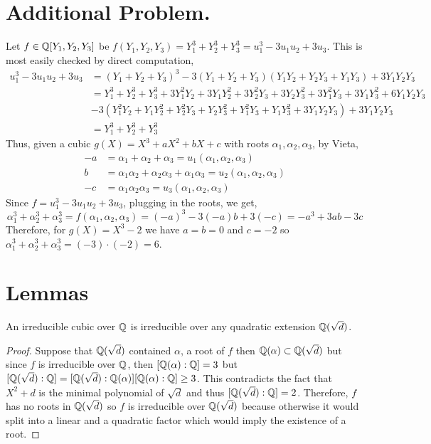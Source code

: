 \documentclass[12pt]{extarticle}
\begin{document}
\section*{Additional Problem.}

Let $f \in \mathbb{Q}[Y_1, Y_2, Y_3]$ be $f(Y_1, Y_2, Y_3) = Y_1^3 + Y_2^3 + Y_3^3 = u_1^3 - 3 u_1 u_2 + 3 u_3$. This is most easily checked by direct computation, 
\begin{align*}
u_1^3 - 3 u_1 u_2 + 3 u_3 & = (Y_1 + Y_2 + Y_3)^3 - 3 (Y_1 + Y_2 + Y_3) ( Y_1 Y_2 + Y_2 Y_3 + Y_1 Y_3) + 3 Y_1 Y_2 Y_3 \\ 
 & = Y_1^3 + Y_2^3 + Y_3^3 + 3 Y_1^2 Y_2 + 3 Y_1 Y_2^2 + 3 Y_2^2 Y_3 + 3 Y_2 Y_3^2 + 3 Y_1^2 Y_3 + 3 Y_1 Y_3^2 + 6 Y_1 Y_2 Y_3 \\
 & - 3(Y_1^2 Y_2 + Y_1 Y_2^2 + Y_2^2 Y_3 + Y_2 Y_3^2 + Y_1^2 Y_3 + Y_1 Y_3^2 + 3 Y_1 Y_2 Y_3) + 3 Y_1 Y_2 Y_3 \\
 & = Y_1^3 + Y_2^3 + Y_3^3    
\end{align*}
Thus, given a cubic $g(X) = X^3 + a X^2 + b X + c$ with roots $\alpha_1, \alpha_2, \alpha_3$, by Vieta, 
\begin{align*}
-a & = \alpha_1 + \alpha_2 + \alpha_3 = u_1(\alpha_1, \alpha_2, \alpha_3) \\ 
 b & = \alpha_1 \alpha_2 + \alpha_2 \alpha_3 + \alpha_1 \alpha_3 = u_2(\alpha_1, \alpha_2, \alpha_3) \\
-c & = \alpha_1 \alpha_2 \alpha_3 = u_3(\alpha_1, \alpha_2, \alpha_3)
\end{align*}
Since $f = u_1^3 - 3 u_1 u_2 + 3 u_3$, plugging in the roots, we get, 
\[\alpha_1^3 + \alpha_2^3 + \alpha_3^3 = f(\alpha_1, \alpha_2, \alpha_3) = (-a)^3 - 3 (-a) b + 3(-c) = -a^3 + 3ab - 3c\] 
Therefore, for $g(X) = X^3 - 2$ we have $a = b = 0$ and $c = -2$ so $\alpha_1^3 + \alpha_2^3 + \alpha_3^3 = (-3) \cdot (-2) = 6$. 

\section*{Lemmas}

\begin{lemma} \label{cubic}
An irreducible cubic over $\mathbb{Q}$ is irreducible over any quadratic extension $\mathbb{Q}(\sqrt{d})$. 
\end{lemma}
\begin{proof}
Suppose that $\mathbb{Q}(\sqrt{d})$ contained $\alpha$, a root of $f$ then $\mathbb{Q}(\alpha) \subset \mathbb{Q}(\sqrt{d})$ but since $f$ is irreducible over $\mathbb{Q}$, then $[\mathbb{Q}(\alpha) : \mathbb{Q}] = 3$ but $[\mathbb{Q}(\sqrt{d}) : \mathbb{Q}] = [\mathbb{Q}(\sqrt{d}) : \mathbb{Q}(\alpha)][\mathbb{Q}(\alpha) : \mathbb{Q}] \ge 3$. This contradicts the fact that $X^2 + d$ is the minimal polynomial of $\sqrt{d}$ and thus $[\mathbb{Q}(\sqrt{d}) : \mathbb{Q}] = 2$. Therefore, $f$ has no roots in $\mathbb{Q}(\sqrt{d})$ so $f$ is irreducible over $\mathbb{Q}(\sqrt{d})$ because otherwise it would split into a linear and a quadratic factor which would imply the existence of a root.
\end{proof}
\end{document}
